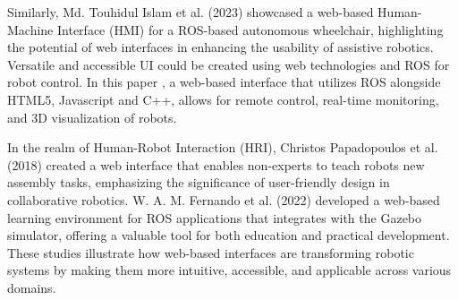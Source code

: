  Similarly, Md. Touhidul Islam et al. (2023) showcased a web-based Human-Machine Interface (HMI) for a ROS-based autonomous wheelchair, highlighting the potential of web interfaces in enhancing the usability of assistive robotics.
Versatile and accessible UI could be created using web technologies and ROS for robot control.
In this paper \cite{Xiao_2019}, a web-based interface that utilizes ROS alongside HTML5, Javascript and C++, allows for remote control, real-time monitoring, and 3D visualization of robots.


In the realm of Human-Robot Interaction (HRI), Christos Papadopoulos et al. (2018) created a web interface that enables non-experts to teach robots new assembly tasks, emphasizing the significance of user-friendly design in collaborative robotics. W. A. M. Fernando et al. (2022) developed a web-based learning environment for ROS applications that integrates with the Gazebo simulator, offering a valuable tool for both education and practical development. These studies illustrate how web-based interfaces are transforming robotic systems by making them more intuitive, accessible, and applicable across various domains.